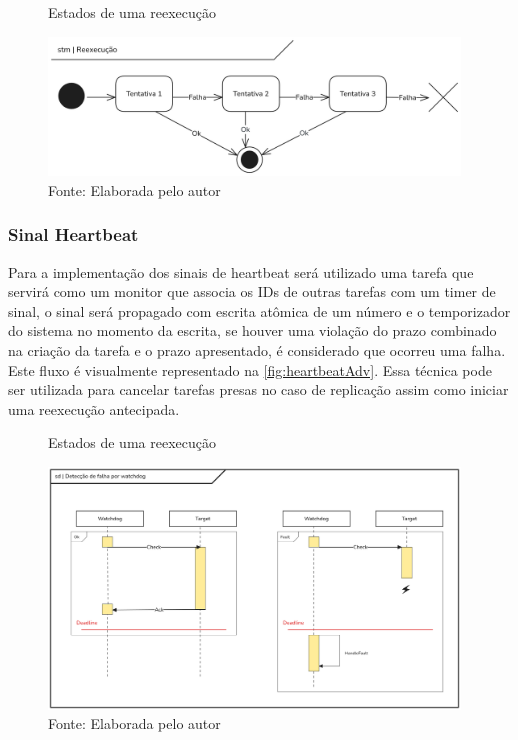 \begin{figure}[H]
    \centering
    \captionsetup{justification=centering}
    \caption{Estados de uma reexecução}
    \includegraphics[width=0.975\textwidth]{assets/state_reexec.png}
    \captionsetup{justification=raggedright}
    \caption*{Fonte: Elaborada pelo autor}
    \label{fig:stateReexec}
\end{figure}

\subsubsection{Sinal Heartbeat}

Para a implementação dos sinais de heartbeat será utilizado uma tarefa que servirá como um monitor que associa os IDs de outras tarefas com um timer de sinal, o sinal será propagado com escrita atômica de um número e o temporizador do sistema no momento da escrita, se houver uma violação do prazo combinado na criação da tarefa e o prazo apresentado, é considerado que ocorreu uma falha. Este fluxo é visualmente representado na \autoref{fig:heartbeatAdv}. Essa técnica pode ser utilizada para cancelar tarefas presas no caso de replicação assim como iniciar uma reexecução antecipada.

\begin{figure}[H]
    \centering
    \captionsetup{justification=centering}
    \caption{Estados de uma reexecução}
    \includegraphics[width=0.975\textwidth]{assets/heartbeat_signal.png} %
    \captionsetup{justification=raggedright}
    \caption*{Fonte: Elaborada pelo autor}
    \label{fig:heartbeatAdv}
\end{figure}

